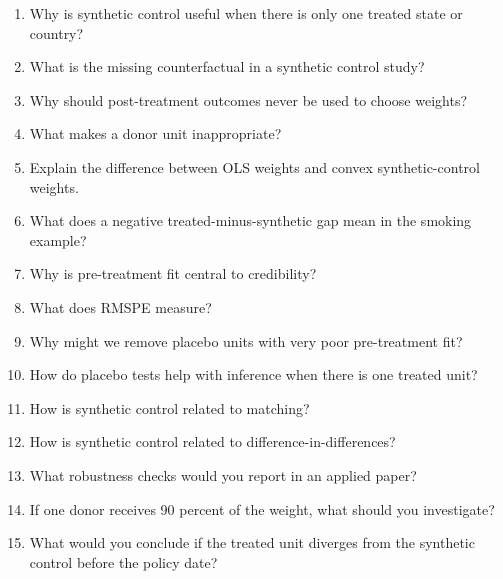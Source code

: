 \begin{enumerate}
\item Why is synthetic control useful when there is only one treated state or country?
\item What is the missing counterfactual in a synthetic control study?
\item Why should post-treatment outcomes never be used to choose weights?
\item What makes a donor unit inappropriate?
\item Explain the difference between OLS weights and convex synthetic-control weights.
\item What does a negative treated-minus-synthetic gap mean in the smoking example?
\item Why is pre-treatment fit central to credibility?
\item What does RMSPE measure?
\item Why might we remove placebo units with very poor pre-treatment fit?
\item How do placebo tests help with inference when there is one treated unit?
\item How is synthetic control related to matching?
\item How is synthetic control related to difference-in-differences?
\item What robustness checks would you report in an applied paper?
\item If one donor receives 90 percent of the weight, what should you investigate?
\item What would you conclude if the treated unit diverges from the synthetic control before the policy date?
\end{enumerate}


